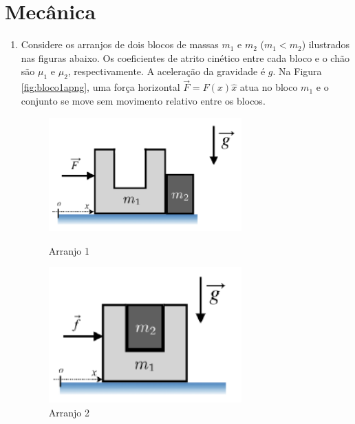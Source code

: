 %
%
\chapter{Mecânica}

\begin{enumerate}[start=1,label={\bfseries Q\arabic*.}]


\item Considere os arranjos de dois blocos de massas $m_{1}$ e $m_{2}$ ($m_{1} < m_{2}$) ilustrados nas figuras abaixo. Os coeficientes de atrito cinético entre cada bloco e o chão são $\mu_{1}$ e $\mu_{2}$, respectivamente. A aceleração da gravidade é $g$. Na Figura \ref{fig:bloco1apng}, uma força horizontal $\vec{F} = F(x)\hat{x}$ atua no bloco $m_{1}$ e o conjunto se move sem movimento relativo entre os blocos.


\begin{figure}[!ht]
	\centering
	\begin{minipage}{0.5\textwidth}
		\centering
		\includegraphics[width=0.7\textwidth]{classica-img/bloco1a.png} 
		\caption{Arranjo 1}
		\label{fig:bloco1apng}
	\end{minipage}\hfill
	\begin{minipage}{0.5\textwidth}
		\centering
		\includegraphics[width=0.7\textwidth]{classica-img/bloco2a.png}
		\caption{Arranjo 2}
		\label{fig:bloco2apng}
	\end{minipage}
\end{figure}


\end{enumerate}
